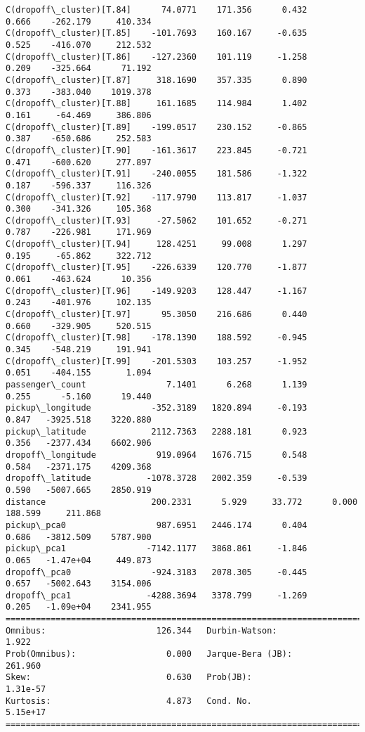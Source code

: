 \documentclass[11pt]{article}
\begin{document}
\begin{Verbatim}[commandchars=\\\{\}]
C(dropoff\_cluster)[T.84]      74.0771    171.356      0.432      0.666    -262.179     410.334
C(dropoff\_cluster)[T.85]    -101.7693    160.167     -0.635      0.525    -416.070     212.532
C(dropoff\_cluster)[T.86]    -127.2360    101.119     -1.258      0.209    -325.664      71.192
C(dropoff\_cluster)[T.87]     318.1690    357.335      0.890      0.373    -383.040    1019.378
C(dropoff\_cluster)[T.88]     161.1685    114.984      1.402      0.161     -64.469     386.806
C(dropoff\_cluster)[T.89]    -199.0517    230.152     -0.865      0.387    -650.686     252.583
C(dropoff\_cluster)[T.90]    -161.3617    223.845     -0.721      0.471    -600.620     277.897
C(dropoff\_cluster)[T.91]    -240.0055    181.586     -1.322      0.187    -596.337     116.326
C(dropoff\_cluster)[T.92]    -117.9790    113.817     -1.037      0.300    -341.326     105.368
C(dropoff\_cluster)[T.93]     -27.5062    101.652     -0.271      0.787    -226.981     171.969
C(dropoff\_cluster)[T.94]     128.4251     99.008      1.297      0.195     -65.862     322.712
C(dropoff\_cluster)[T.95]    -226.6339    120.770     -1.877      0.061    -463.624      10.356
C(dropoff\_cluster)[T.96]    -149.9203    128.447     -1.167      0.243    -401.976     102.135
C(dropoff\_cluster)[T.97]      95.3050    216.686      0.440      0.660    -329.905     520.515
C(dropoff\_cluster)[T.98]    -178.1390    188.592     -0.945      0.345    -548.219     191.941
C(dropoff\_cluster)[T.99]    -201.5303    103.257     -1.952      0.051    -404.155       1.094
passenger\_count                7.1401      6.268      1.139      0.255      -5.160      19.440
pickup\_longitude            -352.3189   1820.894     -0.193      0.847   -3925.518    3220.880
pickup\_latitude             2112.7363   2288.181      0.923      0.356   -2377.434    6602.906
dropoff\_longitude            919.0964   1676.715      0.548      0.584   -2371.175    4209.368
dropoff\_latitude           -1078.3728   2002.359     -0.539      0.590   -5007.665    2850.919
distance                     200.2331      5.929     33.772      0.000     188.599     211.868
pickup\_pca0                  987.6951   2446.174      0.404      0.686   -3812.509    5787.900
pickup\_pca1                -7142.1177   3868.861     -1.846      0.065   -1.47e+04     449.873
dropoff\_pca0                -924.3183   2078.305     -0.445      0.657   -5002.643    3154.006
dropoff\_pca1               -4288.3694   3378.799     -1.269      0.205   -1.09e+04    2341.955
==============================================================================
Omnibus:                      126.344   Durbin-Watson:                   1.922
Prob(Omnibus):                  0.000   Jarque-Bera (JB):              261.960
Skew:                           0.630   Prob(JB):                     1.31e-57
Kurtosis:                       4.873   Cond. No.                     5.15e+17
==============================================================================


\end{Verbatim}
\end{document}
